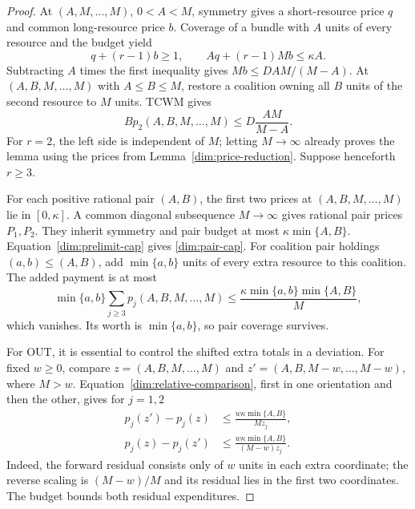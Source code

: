 \documentclass[11pt]{article}
\theoremstyle{definition}\newtheorem{definition}[theorem]{Definition}
\theoremstyle{remark}\newtheorem{remark}[theorem]{Remark}
\begin{document}
\begin{proof}
At $(A,M,\ldots,M)$, $0<A<M$, symmetry gives a short-resource price
$q$ and common long-resource price $b$. Coverage of a bundle with $A$
units of every resource and the budget yield
\[
 q+(r-1)b\ge1,\qquad Aq+(r-1)Mb\le\kappa A.
\]
Subtracting $A$ times the first inequality gives
$Mb\le D A M/(M-A)$.
At $(A,B,M,\ldots,M)$ with $A\le B\le M$, restore a coalition owning
all $B$ units of the second resource to $M$ units. TCWM gives
\begin{equation}\label{dim:prelimit-cap}
 Bp_2(A,B,M,\ldots,M)\le D\frac{AM}{M-A}.
\end{equation}
For $r=2$, the left side is independent of $M$; letting $M\to\infty$
already proves the lemma using the prices from
Lemma~\ref{dim:price-reduction}. Suppose henceforth $r\ge3$.

For each positive rational pair $(A,B)$, the first two prices at
$(A,B,M,\ldots,M)$ lie in $[0,\kappa]$. A common diagonal subsequence
$M\to\infty$ gives rational pair prices $P_1,P_2$.
They inherit symmetry and pair budget at most $\kappa\min\{A,B\}$.
Equation~\eqref{dim:prelimit-cap} gives \eqref{dim:pair-cap}.
For coalition pair holdings $(a,b)\le(A,B)$, add $\min\{a,b\}$ units
of every extra resource to this coalition. The added payment is at most
\[
 \min\{a,b\}\sum_{j\ge3}p_j(A,B,M,\ldots,M)
 \le\frac{\kappa\min\{a,b\}\min\{A,B\}}{M},
\]
which vanishes. Its worth is $\min\{a,b\}$, so pair coverage survives.

For OUT, it is essential to control the shifted extra totals in a
deviation. For fixed $w\ge0$, compare
$z=(A,B,M,\ldots,M)$ and $z'=(A,B,M-w,\ldots,M-w)$, where $M>w$.
Equation~\eqref{dim:relative-comparison}, first in one orientation and
then the other, gives for $j=1,2$
\begin{align}
 p_j(z')-p_j(z)&\le\frac{w\kappa\min\{A,B\}}{Mz_j},
 \label{dim:shift-bound}\\
 p_j(z)-p_j(z')&\le
 \frac{w\kappa\min\{A,B\}}{(M-w)z_j}.\nonumber
\end{align}
Indeed, the forward residual consists only of $w$ units in each extra
coordinate; the reverse scaling is $(M-w)/M$ and its residual lies in
the first two coordinates. The budget bounds both residual expenditures.


\end{proof}
\end{document}
